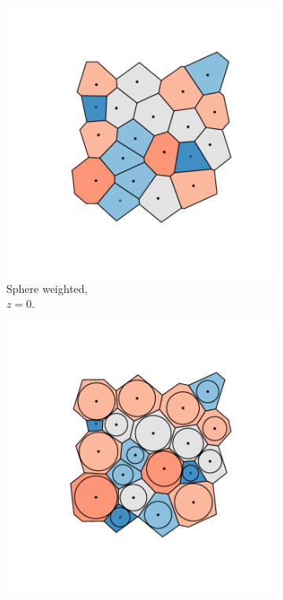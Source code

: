 \begin{figure}[tb]
	\centering
     
      \begin{subfigure}[b]{0.23\textwidth}
         \centering
         \includegraphics[width=\textwidth]{./figures/quasi2d/cut_z0_a.pdf}
         \caption{Sphere weighted, \\$z=0$.}
         \label{fig:cut0a}
     \end{subfigure}
     \hfill
      \begin{subfigure}[b]{0.23\textwidth}
         \centering
         \includegraphics[width=\textwidth]{./figures/quasi2d/cut_z10_a.pdf}

\end{subfigure}
\end{figure}
